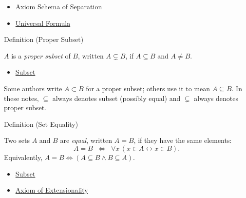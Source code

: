 \begin{dependencies}
\begin{itemize}
  \item \hyperref[ax:separation]{Axiom Schema of Separation}
  \item \hyperref[def:universal-q]{Universal Formula}
\end{itemize}
\end{dependencies}

\begin{definitionbox}{Definition (Proper Subset)}
\begin{definition}\label{def:proper-subset}
$A$ is a \emph{proper subset} of $B$, written $A \subsetneq B$, if
$A \subseteq B$ and $A \neq B$.
\end{definition}
\end{definitionbox}

\begin{dependencies}
\begin{itemize}
  \item \hyperref[def:subset]{Subset}
\end{itemize}
\end{dependencies}

\begin{remark*}
Some authors write $A \subset B$ for a proper subset; others use it to mean
$A \subseteq B$. In these notes, $\subseteq$ always denotes subset (possibly
equal) and $\subsetneq$ always denotes proper subset.
\end{remark*}

\begin{definitionbox}{Definition (Set Equality)}
\begin{definition}\label{def:set-equality}
Two sets $A$ and $B$ are \emph{equal}, written $A = B$, if they have the same
elements:
\[
A = B \;\;\Longleftrightarrow\;\; \forall x \, (x \in A \leftrightarrow x \in B).
\]
Equivalently, $A = B \iff (A \subseteq B \land B \subseteq A)$.
\end{definition}
\end{definitionbox}

\begin{dependencies}
\begin{itemize}
  \item \hyperref[def:subset]{Subset}
  \item \hyperref[ax:extensionality]{Axiom of Extensionality}
\end{itemize}
\end{dependencies}

